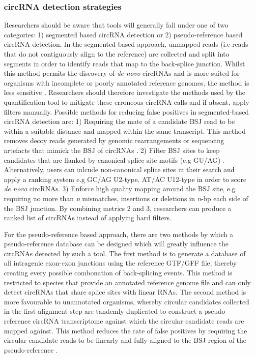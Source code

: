 \documentclass[pdflatex,sn-mathphys-num]{sn-jnl}
\begin{document}
\subsubsection*{circRNA detection strategies}
Researchers should be aware that tools will generally fall under one of two categories: 1) segmented based circRNA detection or 2) pseudo-reference based circRNA detection. In the segmented based approach, unmapped reads (i.e reads that do not contiguously align to the reference) are collected and split into segments in order to identify reads that map to the back-splice junction. Whilst this method permits the discovery of \textit{de novo} circRNAs and is more suited for organisms with incomplete or poorly annotated reference genomes, the method is less sensitive \cite{Jeck2014May}. Researchers should therefore investigate the methods used by the quantification tool to mitigate these erroneous circRNA calls and if absent, apply filters manually. Possible methods for reducing false positives in segmented-based circRNA detection are: 1) Requiring the mate of a candidate BSJ read to be within a suitable distance and mapped within the same transcript. This method removes decoy reads generated by genomic rearrangements or sequencing artefacts that mimick the BSJ of circRNAs \cite{circRNA_finder}. 2) Filter BSJ sites to keep candidates that are flanked by canonical splice site motifs (e.g GU/AG) \cite{find_circ}. Alternatively, users can inlcude non-canonical splice sites in their search and apply a ranking system e.g GC/AG U2-type, AT/AC U12-type \cite{CIRIlong} in order to score \textit{de novo} circRNAs. 3) Enforce high quality mapping around the BSJ site, e.g requiring no more than \textit{n} mismatches, insertions or deletions in \textit{n}-bp each side of the BSJ junction. By combining metrics 2 and 3, researchers can produce a ranked list of circRNAs instead of applying hard filters. \par
For the pseudo-reference based approach, there are two methods by which a pseudo-reference database can be designed which will greatly influence the circRNAs detected by such a tool. The first method is to generate a database of all intragenic exon-exon junctions using the reference GTF/GFF file, thereby creating every possible combonation of back-splicing events. This method is restricted to species that provide an annotated reference genome file and can only detect circRNAs that share splice sites with linear RNAs. The second method is more favourable to unannotated organisms, whereby circular candidates collected in the first alignment step are tandemly duplicated to construct a pseudo-reference circRNA transcriptome against which the circular candidate reads are mapped against. This method reduces the rate of false positives by requiring the circular candidate reads to be linearly and fully aligned to the BSJ region of the pseudo-reference \cite{CIRIquant,Sailfishcir,PTESfinder}. \par
\end{document}

